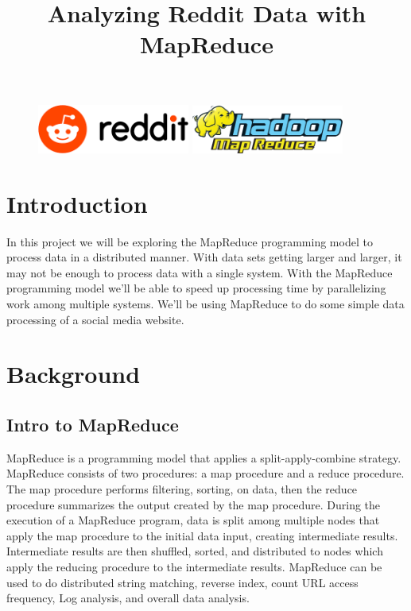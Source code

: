 \documentclass{article}
\title{Analyzing Reddit Data with MapReduce\\ } %
\date{\vspace{-7ex}}
\begin{document}
\maketitle %

\begin{figure}[h!]
 \centering
 \includegraphics[width=50mm]{images/reddit}\hspace{15mm}
 \includegraphics[width=50mm]{images/mapreduce}
\end{figure} 


\section*{Introduction} %
In this project we will be exploring the MapReduce programming model to process data in a distributed manner.  With data sets getting larger and larger, it may not be enough to process data with a single system. With the MapReduce programming model we'll be able to speed up processing time by parallelizing work among multiple systems. We'll be using MapReduce to do some simple data processing of a social media website.


\section*{Background}

\subsection*{Intro to MapReduce}
MapReduce is a programming model that applies a split-apply-combine strategy. MapReduce consists of two procedures: a map procedure and a reduce procedure. The map procedure performs filtering, sorting, on data, then the reduce procedure summarizes the output created by the map procedure. During the execution of a MapReduce program, data is split among multiple nodes that apply the map procedure to the initial data input, creating intermediate results. Intermediate results are then shuffled, sorted, and distributed to nodes which apply the reducing procedure to the intermediate results. MapReduce can be used to do distributed string matching, reverse index, count URL access frequency, Log analysis, and overall data analysis. 
\end{document}
